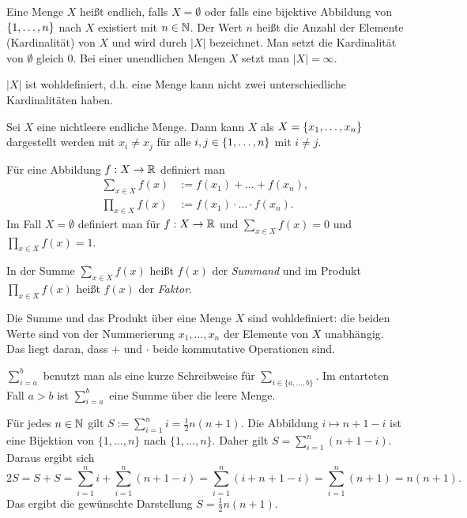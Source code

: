 \begin{defn} 
Eine Menge $ X $ heißt endlich, falls $ X = \emptyset $ oder falls eine bijektive Abbildung von $ \{ 1,\ldots,n \} $ nach $ X $ existiert mit $ n \in \mathbb{N} $. Der Wert $ n $ heißt die Anzahl der Elemente (Kardinalität) von $ X $ und wird durch $ |X| $ bezeichnet. Man setzt die Kardinalität von $ \emptyset $ gleich 0. Bei einer unendlichen Mengen $X$ setzt man $|X| = \infty$. 
\end{defn} 

\begin{bem}
$ |X| $ ist wohldefiniert, d.h. eine Menge kann nicht zwei unterschiedliche Kardinalitäten haben.
\end{bem} 

\begin{defn}
Sei $ X $ eine nichtleere endliche Menge. Dann kann $ X $ als $ X = \{ x_1,\ldots,x_n \} $ dargestellt werden mit  $ x_i \neq x_j $ für alle $ i,j \in \{ 1,\ldots,n \} $ mit $i \ne j$. 

Für eine Abbildung $ f : X \to \mathbb{R} $ definiert man
\begin{align*}
	\sum\limits_{x \in X} f(x) &:= f(x_1) + \ldots + f(x_n),
\\
	\prod\limits_{x \in X} f(x) &:= f(x_1) \cdot \ldots \cdot f(x_n).
\end{align*}
Im Fall $ X = \emptyset $ definiert man für $ f : X \to \mathbb{R} $ und $ \sum\limits_{x \in X} f(x) = 0 $ und $ \prod\limits_{x \in X} f(x) = 1 $.

In der Summe $\sum\limits_{x \in X} f(x)$ heißt $f(x)$ der \emph{Summand} und im Produkt $\prod\limits_{x \in X} f(x)$ heißt $f(x)$ der \emph{Faktor}.  
\end{defn}

\begin{bem} 
	Die Summe und das Produkt über eine Menge $X$ sind wohldefiniert: die beiden Werte sind von der Nummerierung $x_1,\ldots,x_n$ der Elemente von $X$ unabhängig. Das liegt daran, dass $+$ und $\cdot$ beide kommutative Operationen sind. 
\end{bem} 


\begin{bem}
	$\sum\limits_{i=a}^b$ benutzt man als eine kurze Schreibweise für $\sum\limits_{i \in \{a,\ldots,b\}}$. Im entarteten Fall $a>b$ ist $\sum\limits_{i =a}^b$ eine Summe über die leere Menge. 
\end{bem} 

\begin{bsp}
	Für jedes $n \in \mathbb{N}$ gilt $S:=\sum_{i=1}^n i = \frac{1}{2} n (n+1).$ Die Abbildung $i \mapsto n+1 - i$ ist eine Bijektion von $\{1,\ldots,n\}$ nach $\{1,\ldots,n\}$. Daher gilt  $S = \sum_{i=1}^n (n+1 - i)$. Daraus ergibt sich 
	\[
		2 S = S +  S = \sum_{i=1}^n i + \sum_{i=1}^n (n+1 - i) = \sum_{i=1}^n ( i + n + 1 -i) = \sum_{i=1}^n (n+1) = n (n+1). 
	\]
	Das ergibt die gewünschte Darstellung $S = \frac{1}{2} n (n+1)$. 
\end{bsp} 


